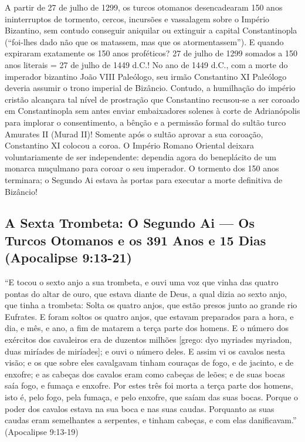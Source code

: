A partir de 27 de julho de 1299, os turcos otomanos desencadearam 150 anos ininterruptos de tormento, cercos, incursões e vassalagem sobre o Império Bizantino, sem contudo conseguir aniquilar ou extinguir a capital Constantinopla (``foi-lhes dado não que os matassem, mas que os atormentassem'').
E quando expiraram exatamente os 150 anos proféticos?
27 de julho de 1299 somados a 150 anos literais = 27 de julho de 1449 d.C.!
No ano de 1449 d.C., com a morte do imperador bizantino João VIII Paleólogo, seu irmão Constantino XI Paleólogo deveria assumir o trono imperial de Bizâncio. Contudo, a humilhação do império cristão alcançara tal nível de prostração que Constantino recusou-se a ser coroado em Constantinopla sem antes enviar embaixadores solenes à corte de Adrianópolis para implorar o consentimento, a bênção e a permissão formal do sultão turco Amurates II (Murad II)! Somente após o sultão aprovar a sua coroação, Constantino XI colocou a coroa. O Império Romano Oriental deixara voluntariamente de ser independente: dependia agora do beneplácito de um monarca muçulmano para coroar o seu imperador. O tormento dos 150 anos terminara; o Segundo Ai estava às portas para executar a morte definitiva de Bizâncio!



\subsection{A Sexta Trombeta: O Segundo Ai — Os Turcos Otomanos e os 391 Anos e 15 Dias (Apocalipse 9:13-21)}


``E tocou o sexto anjo a sua trombeta, e ouvi uma voz que vinha das quatro pontas do altar de ouro, que estava diante de Deus, a qual dizia ao sexto anjo, que tinha a trombeta: Solta os quatro anjos, que estão presos junto ao grande rio Eufrates. E foram soltos os quatro anjos, que estavam preparados para a hora, e dia, e mês, e ano, a fim de matarem a terça parte dos homens. E o número dos exércitos dos cavaleiros era de duzentos milhões [grego: dyo myriades myriadon, duas miríades de miríades]; e ouvi o número deles. E assim vi os cavalos nesta visão; e os que sobre eles cavalgavam tinham couraças de fogo, e de jacinto, e de enxofre; e as cabeças dos cavalos eram como cabeças de leões; e de suas bocas saía fogo, e fumaça e enxofre. Por estes três foi morta a terça parte dos homens, isto é, pelo fogo, pela fumaça, e pelo enxofre, que saíam das suas bocas. Porque o poder dos cavalos estava na sua boca e nas suas caudas. Porquanto as suas caudas eram semelhantes a serpentes, e tinham cabeças, e com elas danificavam.'' (Apocalipse 9:13-19)


